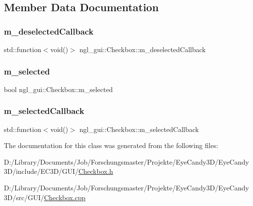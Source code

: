 \subsection{Member Data Documentation}
\mbox{\label{classngl__gui_1_1_checkbox_aa2800070a32c1bd2137f1c16603e3883}} 
\subsubsection{\texorpdfstring{m\+\_\+deselected\+Callback}{m\_deselectedCallback}}
{\footnotesize\ttfamily std\+::function$<$void()$>$ ngl\+\_\+gui\+::\+Checkbox\+::m\+\_\+deselected\+Callback\hspace{0.3cm}{\ttfamily [protected]}}

\mbox{\label{classngl__gui_1_1_checkbox_a218ceb62fd9ac89e1db17810f414984a}} 
\subsubsection{\texorpdfstring{m\+\_\+selected}{m\_selected}}
{\footnotesize\ttfamily bool ngl\+\_\+gui\+::\+Checkbox\+::m\+\_\+selected\hspace{0.3cm}{\ttfamily [protected]}}

\mbox{\label{classngl__gui_1_1_checkbox_a817578052ac5543eac703ba8e5f072c3}} 
\subsubsection{\texorpdfstring{m\+\_\+selected\+Callback}{m\_selectedCallback}}
{\footnotesize\ttfamily std\+::function$<$void()$>$ ngl\+\_\+gui\+::\+Checkbox\+::m\+\_\+selected\+Callback\hspace{0.3cm}{\ttfamily [protected]}}



The documentation for this class was generated from the following files\+:\begin{DoxyCompactItemize}
\item 
D\+:/\+Library/\+Documents/\+Job/\+Forschungsmaster/\+Projekte/\+Eye\+Candy3\+D/\+Eye\+Candy3\+D/include/\+E\+C3\+D/\+G\+U\+I/\mbox{\hyperlink{_checkbox_8h}{Checkbox.\+h}}\item 
D\+:/\+Library/\+Documents/\+Job/\+Forschungsmaster/\+Projekte/\+Eye\+Candy3\+D/\+Eye\+Candy3\+D/src/\+G\+U\+I/\mbox{\hyperlink{_checkbox_8cpp}{Checkbox.\+cpp}}\end{DoxyCompactItemize}

